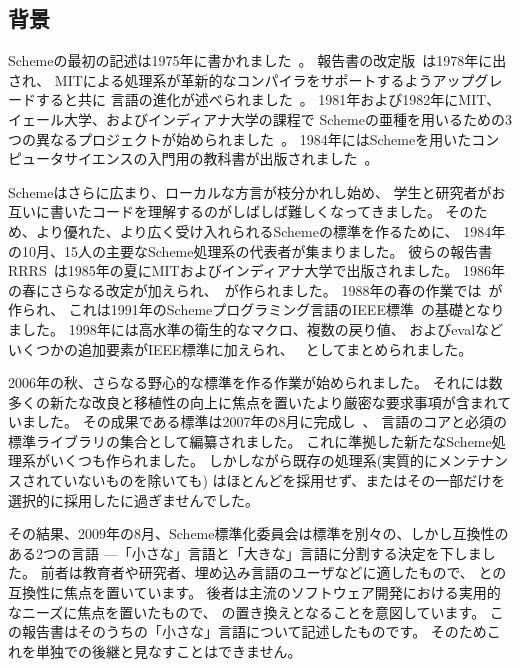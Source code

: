 \subsection*{背景}

\vest Schemeの最初の記述は1975年に書かれました~\cite{Scheme75}。
報告書の改定版~\cite{Scheme78}は1978年に出され、
MITによる処理系が革新的なコンパイラをサポートするようアップグレードすると共に
言語の進化が述べられました~\cite{Rabbit}。
1981年および1982年にMIT、イェール大学、およびインディアナ大学の課程で
Schemeの亜種を用いるための3つの異なるプロジェクトが始められました~\cite{Rees82,MITScheme,Scheme311}。
1984年にはSchemeを用いたコンピュータサイエンスの入門用の教科書が出版されました~\cite{SICP}。

\vest Schemeはさらに広まり、ローカルな方言が枝分かれし始め、
学生と研究者がお互いに書いたコードを理解するのがしばしば難しくなってきました。
そのため、より優れた、より広く受け入れられるSchemeの標準を作るために、
1984年の10月、15人の主要なScheme処理系の代表者が集まりました。
彼らの報告書RRRS~\cite{RRRS}は1985年の夏にMITおよびインディアナ大学で出版されました。
1986年の春にさらなる改定が加えられ、\rthreers~\cite{R3RS}が作られました。
1988年の春の作業では\rfourrs~\cite{R4RS}が作られ、
これは1991年のSchemeプログラミング言語のIEEE標準~\cite{IEEEScheme}の基礎となりました。
1998年には高水準の衛生的なマクロ、複数の戻り値、
およびevalなどいくつかの追加要素がIEEE標準に加えられ、
\rfivers~\cite{R5RS}としてまとめられました。


2006年の秋、さらなる野心的な標準を作る作業が始められました。
それには数多くの新たな改良と移植性の向上に焦点を置いたより厳密な要求事項が含まれていました。
その成果である標準\rsixrs{}は2007年の8月に完成し~\cite{R6RS}、
言語のコアと必須の標準ライブラリの集合として編纂されました。
これに準拠した新たなScheme処理系がいくつも作られました。
しかしながら既存の\rfivers{}処理系(実質的にメンテナンスされていないものを除いても)
はほとんど\rsixrs{}を採用せず、またはその一部だけを選択的に採用したに過ぎませんでした。

その結果、2009年の8月、Scheme標準化委員会は標準を別々の、しかし互換性のある2つの言語
---「小さな」言語と「大きな」言語に分割する決定を下しました。
前者は教育者や研究者、埋め込み言語のユーザなどに適したもので、
\rfivers{}との互換性に焦点を置いています。
後者は主流のソフトウェア開発における実用的なニーズに焦点を置いたもので、
\rsixrs{}の置き換えとなることを意図しています。
この報告書はそのうちの「小さな」言語について記述したものです。
そのためこれを単独で\rsixrs{}の後継と見なすことはできません。



